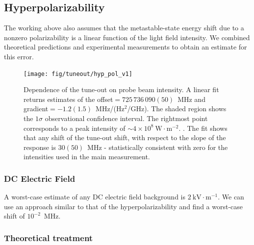 \subsection{Hyperpolarizability}

	The working above also assumes that the metastable-state energy shift due to a nonzero polarizability is a linear function of the light field intensity. 
	We combined theoretical predictions and experimental measurements to obtain an estimate for this error.
	

	\begin{figure}[t]
	    \centering
	    \texttt{[image: fig/tuneout/hyp\_pol\_v1]}
	    \caption{Dependence of the tune-out on probe beam intensity. 
	    A linear fit returns estimates of the offset\(=725\,736\,090(50)\)~MHz and gradient\(=-1.2(1.5)\)~MHz/(Hz\(^2\)/GHz).
	    The shaded region shows the \(1\sigma\) observational confidence interval.
	    The rightmost point corresponds to a peak intensity of \(\sim4\times10^{8}\: \mathrm{W}\cdot \mathrm{m}^{-2}\). 
	    . 
	    The fit shows that any shift of the tune-out shift, with respect to the slope of the response is $30(50)$~MHz - statistically consistent with zero for the intensities used in the main measurement.
	    }
	    \label{fig:hyperpolarizability}
	\end{figure}

\subsubsection{DC Electric Field}

	A worst-case estimate of any DC electric field background is $2~\text{kV}\cdot\text{m}^{-1}$. 
	We can use an approach similar to that of the hyperpolarizability  and find a worst-case shift of \(10^{-2}\)~MHz.

\subsubsection{Theoretical treatment}

